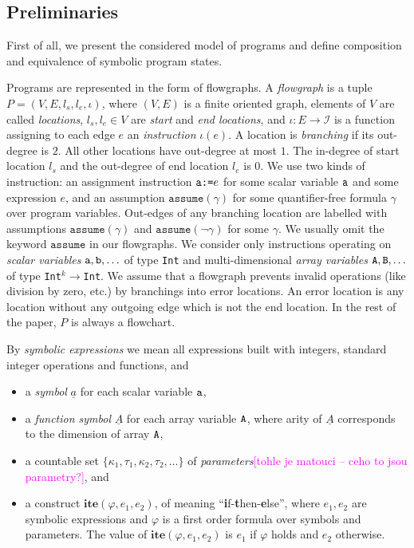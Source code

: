 \documentclass{sig-alternate}%
\newcommand{\note}[1]{{\scriptsize{{\textcolor{magenta}{[#1]}}}}}
\newcommand{\ite}{\ensuremath{\mathbf{ite}}}
\newcommand{\var}[1]{{\tt #1}}
\newcommand{\sym}[1]{\ensuremath{\underline{#1}}}
\begin{document}

\subsection{Preliminaries}

First of all, we present the considered model of programs and define
composition and equivalence of symbolic program states.

Programs are represented in the form of flowgraphs. A \emph{flowgraph} is a
tuple $P=(V,E,l_s,l_e,\iota)$, where $(V,E)$ is a finite oriented graph,
elements of $V$ are called \emph{locations}, $l_s,l_e\in V$ are \emph{start}
and \emph{end locations}, and $\iota:E\rightarrow\mathcal{I}$ is a function
assigning to each edge $e$ an \emph{instruction} $\iota(e)$. A location is
\emph{branching} if its out-degree is $2$. All other locations have
out-degree at most $1$. The in-degree of start location $l_s$ and the
out-degree of end location $l_e$ is 0. We use two kinds of instruction: an
assignment instruction $\var{a}\texttt{:=}e$ for some scalar variable
$\var{a}$ and some expression $e$, and an assumption
$\texttt{assume}(\gamma)$ for some quantifier-free formula $\gamma$ over
program variables. Out-edges of any branching location are labelled with
assumptions $\texttt{assume}(\gamma)$ and $\texttt{assume}(\neg\gamma)$ for
some $\gamma$. We usually omit the keyword $\texttt{assume}$ in our
flowgraphs. We consider only instructions operating on \emph{scalar
  variables} $\var{a},\var{b},\ldots$ of type \texttt{Int} and
multi-dimensional \emph{array variables} $\var{A},\var{B},\ldots$ of type
\texttt{Int}$^k\rightarrow$\texttt{Int}. We assume that a flowgraph prevents
invalid operations (like division by zero, etc.) by branchings into error
locations. An error location is any location without any outgoing edge which
is not the end location. In the rest of the paper, $P$ is always a
flowchart.

\medskip By \emph{symbolic expressions} we mean all expressions built with
integers, standard integer operations and functions, and
\begin{itemize}
\item a \emph{symbol} $\sym{a}$ for each scalar variable $\var{a}$,
\item a \emph{function symbol} $\sym{A}$ for each array variable $\var{A}$,
  where arity of $\sym{A}$ corresponds to the dimension of array $\var{A}$,
\item a countable set $\{\kappa_1,\tau_1,\kappa_2,\tau_2,\ldots\}$ of
  \emph{parameters}\note{tohle je matouci -- ceho to jsou parametry?}, and
\item a construct $\ite(\varphi,e_1,e_2)$, of meaning
  ``\textbf{i}f-\textbf{t}hen-\textbf{e}lse'', where $e_1,e_2$ are symbolic
  expressions and $\varphi$ is a first order formula over symbols and
  parameters. The value of $\ite(\varphi,e_1,e_2)$ is $e_1$ if $\varphi$
  holds and $e_2$ otherwise.
\end{itemize}
\end{document}
